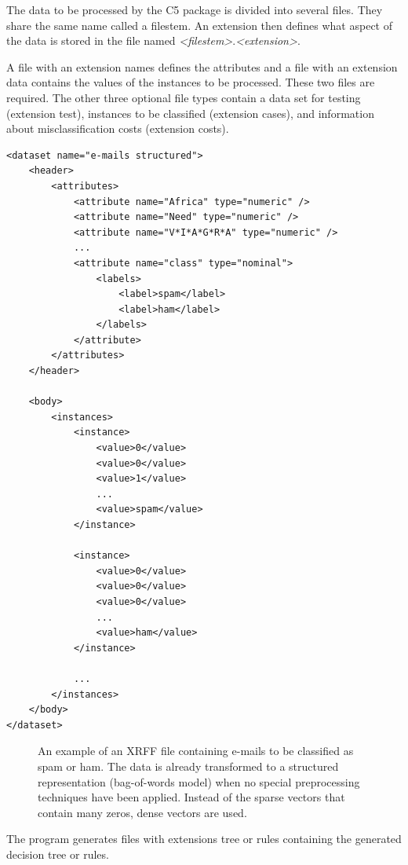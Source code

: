 The data to be processed by the C5 package is divided into several files. They
share the same name called a filestem. An extension then defines what aspect of
the data is stored in the file named \textit{<filestem>}.\textit{<extension>}.

A file with an extension names defines the attributes and a file with an extension data contains the values of the instances to be processed. These two files
are required. The other three optional file types contain a data set for testing (extension test), instances to be classified (extension cases), and information about
misclassification costs (extension costs).

\begin{verbatim}
<dataset name="e-mails structured">
    <header>
        <attributes>
            <attribute name="Africa" type="numeric" />
            <attribute name="Need" type="numeric" />
            <attribute name="V*I*A*G*R*A" type="numeric" />
            ...
            <attribute name="class" type="nominal">
                <labels>
                    <label>spam</label>
                    <label>ham</label>
                </labels>
            </attribute>
        </attributes>
    </header>

    <body>
        <instances>
            <instance>
                <value>0</value>
                <value>0</value>
                <value>1</value>
                ...
                <value>spam</value>
            </instance>

            <instance>
                <value>0</value>
                <value>0</value>
                <value>0</value>
                ...
                <value>ham</value>
            </instance>

            ...
        </instances>
    </body>
</dataset>
\end{verbatim}

\begin{figure}[H]
    \centering
    \caption{An example of an XRFF file containing e-mails to be classified as spam or ham.
The data is already transformed to a structured representation (bag-of-words model) when no
special preprocessing techniques have been applied. Instead of the sparse vectors that contain
many zeros, dense vectors are used.
}
    \label{fig:placeholder312}
\end{figure}

The program generates files with extensions tree or rules containing the generated decision tree or rules.

